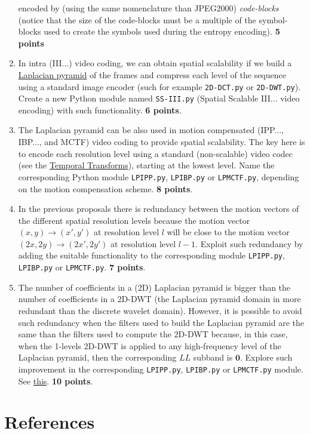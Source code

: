 \begin{enumerate}
  encoded by (using the same nomenclature than JPEG2000)
  \emph{code-blocks} (notice that the size of the code-blocks must be
  a multiple of the symbol-blocks used to create the symbols used
  during the entropy encoding). \textbf{5 points}
\item In intra (III...) video coding, we can obtain spatial
  scalability if we build a
  \href{https://en.wikipedia.org/wiki/Pyramid_(image_processing)#Laplacian_pyramid}{Laplacian
    pyramid} of the frames and compress each level of the sequence
  using a standard image encoder (such for example \texttt{2D-DCT.py}
  or \texttt{2D-DWT.py}). Create a new Python module named
  \texttt{SS-III.py} (Spatial Scalable III... video encoding) with
  such functionality. \textbf{6 points}.
\item The Laplacian pyramid can be also used in motion compensated
  (IPP..., IBP..., and MCTF) video coding to provide spatial
  scalability. The key here is to encode each resolution level using a
  standard (non-scalable) video codec (see the
  \href{https://sistemas-multimedia.github.io/contents/temporal_transforms/}{Temporal
    Transforms}), starting at the lowest level. Name the corresponding
  Python module \texttt{LPIPP.py}, \texttt{LPIBP.py} or
  \texttt{LPMCTF.py}, depending on the motion compensation
  scheme. \textbf{8 points}.
\item In the previous proposals there is redundancy between the motion
  vectors of the different spatial resolution levels because the
  motion vector $(x, y)\rightarrow (x', y')$ at resolution level $l$
  will be close to the motion vector $(2x, 2y)\rightarrow(2x',2y')$ at
  resolution level $l-1$. Exploit such redundancy by adding the
  suitable functionality to the corresponding module
  \texttt{LPIPP.py}, \texttt{LPIBP.py} or
  \texttt{LPMCTF.py}. \textbf{7 points}.
\item The number of coefficients in a (2D) Laplacian pyramid is bigger
  than the number of coefficients in a 2D-DWT (the Laplacian pyramid
  domain in more redundant than the discrete wavelet domain). However,
  it is possible to avoid such redundancy when the filters used to
  build the Laplacian pyramid are the same than the filters used to
  compute the 2D-DWT because, in this case, when the 1-levels 2D-DWT
  is applied to any high-frequency level of the Laplacian pyramid,
  then the corresponding $LL$ subband is $\mathbf{0}$. Explore such
  improvement in the corresponding \texttt{LPIPP.py},
  \texttt{LPIBP.py} or \texttt{LPMCTF.py} module. See
  \href{https://vicente-gonzalez-ruiz.github.io/pyramids-and-wavelets/}{this}.
  \textbf{10 points}.
\end{enumerate}

\section{References}

\renewcommand{\addcontentsline}[3]{}%


